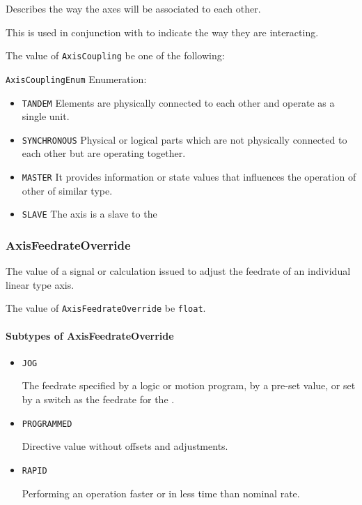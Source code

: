 Describes the way the axes will be associated to each other. 
  
This is used in conjunction with  to indicate the way they are interacting.


The value of \texttt{AxisCoupling} \MUST be one of the following: 


\texttt{AxisCouplingEnum} Enumeration:

\begin{itemize}
\item \texttt{TANDEM} \newline Elements are physically connected to each other and operate as a single unit. 
\item \texttt{SYNCHRONOUS} \newline Physical or logical parts which are not physically connected to each other but are operating together. 
\item \texttt{MASTER} \newline It provides information or state values that influences the operation of other  of similar type. 
\item \texttt{SLAVE} \newline The axis is a slave to the  
\end{itemize}



\subsubsection{AxisFeedrateOverride}
\label{sec:AxisFeedrateOverride}



The value of a signal or calculation issued to adjust the feedrate of an individual linear type axis.


The value of \texttt{AxisFeedrateOverride} \MUST be \texttt{float}.


\paragraph{Subtypes of AxisFeedrateOverride}\mbox{}
\label{sec:Subtypes of AxisFeedrateOverride}

\begin{itemize}

\item \texttt{JOG}


The feedrate specified by a logic or motion program, by a pre-set value, or set by a switch as the feedrate for the . 

\item \texttt{PROGRAMMED}


Directive value without offsets and adjustments.

\item \texttt{RAPID}


Performing an operation faster or in less time than nominal rate.


\end{itemize}






